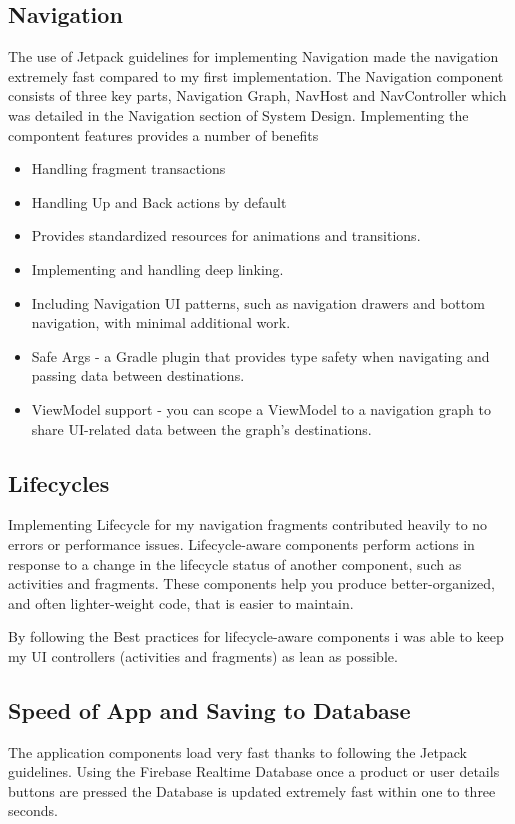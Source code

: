 \subsection{Navigation}
The use of Jetpack guidelines for implementing Navigation made the navigation extremely fast compared to my first implementation.
The Navigation component consists of three key parts, Navigation Graph, NavHost and NavController which was detailed in the Navigation section of System Design.\newline
Implementing the compontent features provides a number of benefits
\begin{itemize}
    \item Handling fragment transactions
    \item Handling Up and Back actions by default
    \item Provides standardized resources for animations and transitions.
    \item Implementing and handling deep linking.
    \item Including Navigation UI patterns, such as navigation drawers and bottom navigation, with minimal additional work.
    \item Safe Args - a Gradle plugin that provides type safety when navigating and passing data between destinations.
    \item ViewModel support - you can scope a ViewModel to a navigation graph to share UI-related data between the graph's destinations.
\end{itemize}

\subsection{Lifecycles}
Implementing Lifecycle for my navigation fragments contributed heavily to no errors or performance issues.
Lifecycle-aware components perform actions in response to a change in the lifecycle status of another component, such as activities and fragments. These components help you produce better-organized, and often lighter-weight code, that is easier to maintain.\newline

By following the Best practices for lifecycle-aware components \cite{android_lifecycles} i was able to keep my UI controllers (activities and fragments) as lean as possible.

\subsection{Speed of App and Saving to Database}
The application components load very fast thanks to following the Jetpack guidelines. Using the Firebase Realtime Database once a product or user details buttons are pressed the Database is updated extremely fast within one to three seconds.

